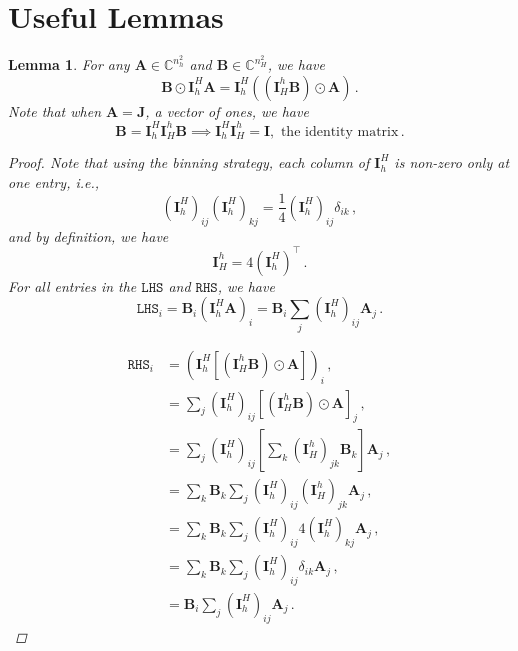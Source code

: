 \documentclass{article}
\numberwithin{equation}{section}
\newtheorem{lemma}[theorem]{Lemma}     %
\begin{document}
\section{Useful Lemmas} 
\begin{lemma}\label{lem:commutative}
For any $\bm{A}\in\mathbb{C}^{n_h^2}$ and $\bm{B}\in\mathbb{C}^{n_H^2}$, we have
    \begin{equation*}
        \bm{B}\odot \bm{I}_h^H\bm{A} = \bm{I}_h^H((\bm{I}_H^h\bm{B})\odot\bm{A})\,.
    \end{equation*}
Note that when $\bm{A}=\bm{J}$, a vector of ones, we have 
\begin{equation*}
    \bm{B} = \bm{I}_h^H\bm{I}_H^h\bm{B}\implies \bm{I}_h^H\bm{I}_H^h = \bm{I},\text{ the identity matrix}\,.
\end{equation*}

    \begin{proof}
    Note that using the binning strategy, each column of $\bm{I}_h^H$ is non-zero only at one entry, i.e.,
  \begin{equation*}
    (\bm{I}_h^H)_{ij}(\bm{I}_h^H)_{kj} = \frac{1}{4}(\bm{I}_h^H)_{ij}\delta_{ik}\,,
  \end{equation*}
  and by definition, we have
  \begin{equation*}
      \bm{I}_H^h = 4(\bm{I}_h^H)^\top\,.
  \end{equation*}
    For all entries in the $\texttt{LHS}$ and $\texttt{RHS}$, we have 
    \begin{equation*}
            \texttt{LHS}_i = \bm{B}_i(\bm{I}_h^H\bm{A})_i = \bm{B}_i\sum_{j}(\bm{I}_h^H)_{ij}\bm{A}_j\,.
    \end{equation*}
    \item 
    \begin{equation*}
        \begin{aligned}
            \texttt{RHS}_i &= (\bm{I}_h^H[(\bm{I}_H^h\bm{B})\odot\bm{A}])_i\,,\\
            &= \sum_{j}(\bm{I}_h^H)_{ij}[(\bm{I}_H^h\bm{B})\odot\bm{A}]_j\,,\\
            &= \sum_{j}(\bm{I}_h^H)_{ij}\left[\sum_{k}(\bm{I}_H^h)_{jk}\bm{B}_k\right]\bm{A}_j\,,\\
            &= \sum_{k}\bm{B}_k\sum_{j}(\bm{I}_h^H)_{ij}(\bm{I}_H^h)_{jk}\bm{A}_j\,,\\
            &= \sum_{k}\bm{B}_k\sum_{j}(\bm{I}_h^H)_{ij}4(\bm{I}_h^H)_{kj}\bm{A}_j\,,\\
             &= \sum_{k}\bm{B}_k\sum_{j}(\bm{I}_h^H)_{ij}\delta_{ik}\bm{A}_j\,,\\
             &= \bm{B}_i\sum_{j}(\bm{I}_h^H)_{ij}\bm{A}_j\,.
        \end{aligned}
    \end{equation*}
    \end{proof}
\end{lemma}
\end{document}
